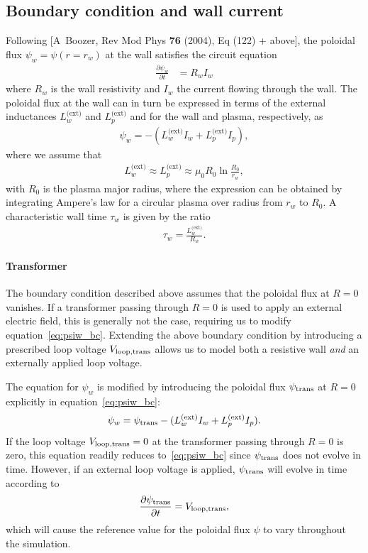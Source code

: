 \documentclass[11pt,a4paper]{article}
\begin{document}
\subsection{Boundary condition and wall current}
Following [A~Boozer, Rev Mod Phys {\bf 76} (2004), Eq (122) + above], the poloidal flux $\psi_w = \psi(r=r_w)$ at the wall satisfies the circuit equation
\begin{align}
\frac{\partial \psi_w}{\partial t} &= R_w I_w
\end{align}
where $R_w$ is the wall resistivity and $I_w$ the current flowing through the wall. The poloidal flux at the wall can in turn be expressed in terms of the external inductances $L_w^\text{(ext)}$ and $L_p^\text{(ext)}$ and for the wall and plasma, respectively, as
\begin{align}\label{eq:psiw_bc}
\psi_w = -(L_w^\text{(ext)} I_w + L_p^\text{(ext)} I_p),
\end{align}
where we assume that 
\begin{align}
L_w^\text{(ext)} \approx L_p^\text{(ext)} \approx \mu_0 R_0 \ln\frac{R_0}{r_w},
\end{align}
with $R_0$ is the plasma major radius, where the expression can be obtained by integrating Ampere's law for a circular plasma over radius from $r_w$ to $R_0$. A characteristic wall time $\tau_w$ is given by the ratio
\begin{align}
\tau_w = \frac{L_w^\text{(ext)}}{R_w}.
\end{align}

\paragraph{Transformer}
The boundary condition described above assumes that the poloidal flux at $R=0$ vanishes. If a transformer passing through $R=0$ is used to apply an external electric field, this is generally not the case, requiring us to modify equation~\eqref{eq:psiw_bc}. Extending the above boundary condition by introducing a prescribed loop voltage $V_{\rm loop,trans}$ allows us to model both a resistive wall {\em and} an externally applied loop voltage.

The equation for $\psi_w$ is modified by introducing the poloidal flux $\psi_{\rm trans}$ at $R=0$ explicitly in equation~\eqref{eq:psiw_bc}:
\begin{equation}
    \psi_w = \psi_{\rm trans} - (L_w^\text{(ext)} I_w + L_p^\text{(ext)} I_p).
\end{equation}
If the loop voltage $V_{\rm loop,trans}=0$ at the transformer passing through $R=0$ is zero, this equation readily reduces to~\eqref{eq:psiw_bc} since $\psi_{\rm trans}$ does not evolve in time. However, if an external loop voltage is applied, $\psi_{\rm trans}$ will evolve in time according to
\begin{equation}
    \frac{\partial\psi_{\rm trans}}{\partial t} = V_{\rm loop,trans},
\end{equation}
which will cause the reference value for the poloidal flux $\psi$ to vary throughout the simulation.
\end{document}

